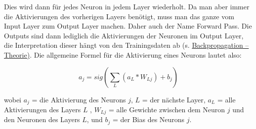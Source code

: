 \documentclass[11pt, a4paper, ngerman]{article}
\begin{document}
		Dies wird dann für jedes Neuron in jedem Layer wiederholt. Da man aber immer die Aktivierungen des vorherigen Layers benötigt, muss man das ganze vom Input Layer zum Output Layer machen. Daher auch der Name Forward Pass. Die Outputs sind dann lediglich die Aktivierungen der Neuronen im Output Layer, die Interpretation dieser hängt von den Trainingsdaten ab (s. \hyperref[Backpropagation - Theorie]{Backpropagation -- Theorie)}.
		Die allgemeine Formel für die Aktivierung eines Neurons lautet also:
		
		{\Large \[a_{j} = sig\left(\sum_{L} (a_{L} * W_{Lj}) + b_{j}\right)\]}
		
		\noindent wobei $a_j$ = die Aktivierung des Neurons $j$, $L$ = der nächste Layer, $a_L$ = alle Aktivierungen des Layers $L$ , $W_{Lj}$ = alle Gewichte zwischen dem Neuron $j$ und den Neuronen des Layers $L$, und $b_j$ = der Bias des Neurons $j$.\\[2ex]
\end{document}
